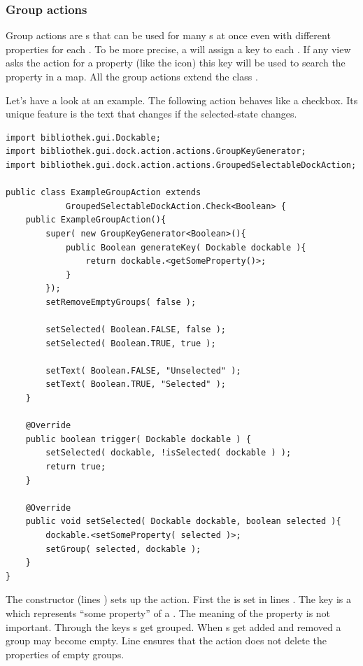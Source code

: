\subsubsection{Group actions}
Group actions are s that can be used for many s at once even with different properties for each . To be more precise, a \linebreak {} will assign a key to each . If any view asks the action for a property (like the icon) this key will be used to search the property in a map. All the group actions extend the class .

Let's have a look at an example. The following action behaves like a checkbox. Its unique feature is the text that changes if the selected-state changes.
\begin{lstlisting}
import bibliothek.gui.Dockable;
import bibliothek.gui.dock.action.actions.GroupKeyGenerator;
import bibliothek.gui.dock.action.actions.GroupedSelectableDockAction;

public class ExampleGroupAction extends 
			GroupedSelectableDockAction.Check<Boolean> {
    public ExampleGroupAction(){
        super( new GroupKeyGenerator<Boolean>(){
        	public Boolean generateKey( Dockable dockable ){
        		return dockable.<getSomeProperty()>;
        	}
        });
        setRemoveEmptyGroups( false );
                
        setSelected( Boolean.FALSE, false );
        setSelected( Boolean.TRUE, true );
        
        setText( Boolean.FALSE, "Unselected" );
        setText( Boolean.TRUE, "Selected" );
    }
    
    @Override
    public boolean trigger( Dockable dockable ) {
        setSelected( dockable, !isSelected( dockable ) );
        return true;
    }
    
    @Override
    public void setSelected( Dockable dockable, boolean selected ){
    	dockable.<setSomeProperty( selected )>;
    	setGroup( selected, dockable );
    }    
}
\end{lstlisting}
The constructor (lines ) sets up the action. First the  is set in lines . The key is a  which represents ``some property'' of a . The meaning of the property is not important. Through the keys s get grouped. When s get added and removed a group may become empty. Line  ensures that the action does not delete the properties of empty groups.

